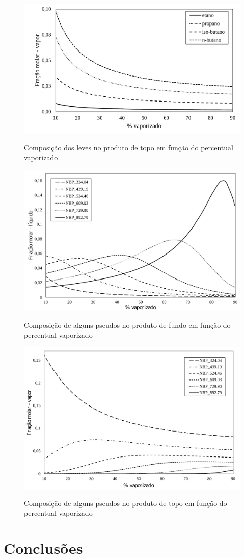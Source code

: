 \begin{figure}[htb]
\centering
{\includegraphics[width=1.0\textwidth]{img/trab3vap.pdf}} 
\caption{Composição dos leves no produto de topo em função do percentual
vaporizado}
\label{fig:vap}
\end{figure}

\begin{figure}[htb] 
\centering
{\includegraphics[width=1.0\textwidth]{img/trab3liqall.pdf}} 
\caption{Composição de alguns pseudos no produto de fundo em função do
percentual vaporizado}
\label{fig:liqall}
\end{figure}

\begin{figure}[htb]
\centering
{\includegraphics[width=1.0\textwidth]{img/trab3vapall.pdf}} 
\caption{Composição de alguns pseudos no produto de topo em função do
percentual vaporizado}
\label{fig:vapall}
\end{figure}

\clearpage
\section{Conclusões}  

